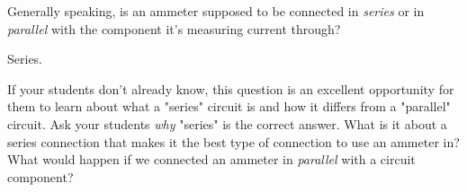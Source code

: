 

Generally speaking, is an ammeter supposed to be connected in {\it series} or in {\it parallel} with the component it's measuring current through?







Series.







If your students don't already know, this question is an excellent opportunity for them to learn about what a "series" circuit is and how it differs from a "parallel" circuit.  Ask your students {\it why} "series" is the correct answer.  What is it about a series connection that makes it the best type of connection to use an ammeter in?  What would happen if we connected an ammeter in {\it parallel} with a circuit component?




